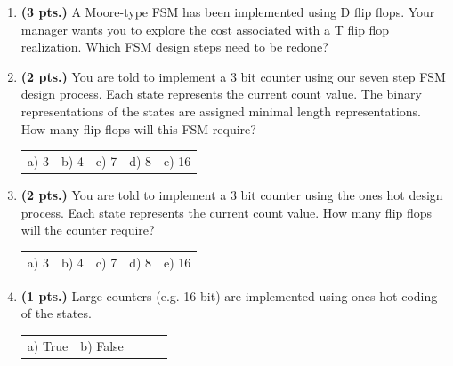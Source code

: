 \documentclass{article}
\begin{document}
\begin{enumerate}
\item {\bf (3 pts.)} A Moore-type FSM has been implemented using D flip
flops.  Your manager wants you to explore the cost associated with
a T flip flop realization.  Which FSM design steps need to be redone?

\item {\bf (2 pts.)} You are told to implement a 3 bit counter using our seven
step FSM design process.  Each state represents the current count value.  The
binary representations of the states are assigned minimal length representations.
How many flip flops will this FSM require?

\begin{tabular}{p{0.75in}p{0.75in}p{0.75in}p{0.75in}p{0.75in}}
a) 3 & b) 4 & c) 7 & d) 8 & e) 16 \\
\end{tabular}

\item {\bf (2 pts.)} You are told to implement a 3 bit counter using the
ones hot design process.  Each state represents the current count value. 
How many flip flops will the counter require?

\begin{tabular}{p{0.75in}p{0.75in}p{0.75in}p{0.75in}p{0.75in}}
a) 3 & b) 4 & c) 7 & d) 8 & e) 16 \\
\end{tabular}

\item {\bf (1 pts.)} Large counters (e.g. 16 bit) are implemented using ones hot 
coding of the states.

\begin{tabular}{p{0.75in}p{0.75in}p{0.75in}p{0.75in}p{0.75in}}
a) True & b) False  &      &      &      \\
\end{tabular}


\end{enumerate}
\end{document}
